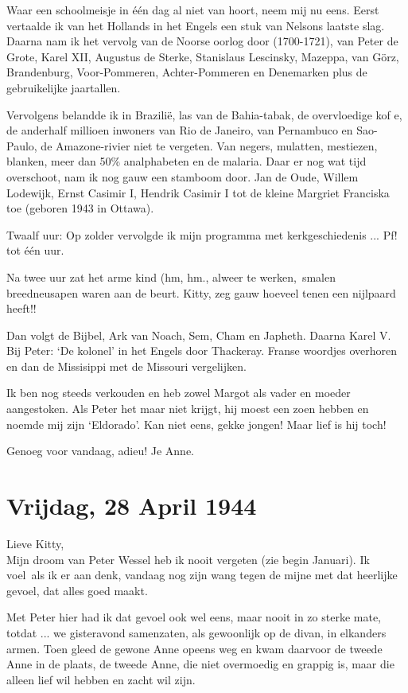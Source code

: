 \documentclass{book}
\begin{document}
Waar een schoolmeisje in één dag al niet van hoort, neem mij nu eens.
Eerst vertaalde ik van het Hollands in het Engels een stuk van Nelsons
laatste slag. Daarna nam ik het vervolg van de Noorse oorlog door
(1700-1721), van Peter de Grote, Karel XII, Augustus de Sterke,
Stanislaus Lescinsky, Mazeppa, van Görz, Brandenburg, Voor-Pommeren,
Achter-Pommeren en Denemarken plus de gebruikelijke jaartallen.

Vervolgens belandde ik in Brazilië, las van de Bahia-tabak, de
overvloedige kof e, de anderhalf millioen inwoners van Rio de Janeiro,
van Pernambuco en Sao-Paulo, de Amazone-rivier niet te vergeten. Van
negers, mulatten, mestiezen, blanken, meer dan 50\% analphabeten en de
malaria. Daar er nog wat tijd overschoot, nam ik nog gauw een stamboom
door. Jan de Oude, Willem Lodewijk, Ernst Casimir I, Hendrik Casimir I
tot de kleine Margriet Franciska toe (geboren 1943 in Ottawa).

Twaalf uur: Op zolder vervolgde ik mijn programma met kerkgeschiedenis
... Pf! tot één uur.

Na twee uur zat het arme kind (hm, hm., alweer te werken,~smalen
breedneusapen waren aan de beurt. Kitty, zeg gauw hoeveel tenen een
nijlpaard heeft!!

Dan volgt de Bijbel, Ark van Noach, Sem, Cham en Japheth. Daarna Karel
V. Bij Peter: `De kolonel' in het Engels door Thackeray. Franse woordjes
overhoren en dan de Missisippi met de Missouri vergelijken.

Ik ben nog steeds verkouden en heb zowel Margot als vader en moeder
aangestoken. Als Peter het maar niet krijgt, hij moest een zoen hebben
en noemde mij zijn `Eldorado'. Kan niet eens, gekke jongen! Maar lief is
hij toch!

Genoeg voor vandaag, adieu! Je Anne.

\chapter{Vrijdag, 28 April 1944}

Lieve Kitty,\\Mijn droom van Peter Wessel heb ik nooit vergeten (zie
begin Januari). Ik voel~als ik er aan denk, vandaag nog zijn wang tegen
de mijne met dat heerlijke gevoel, dat alles goed maakt.

Met Peter hier had ik dat gevoel ook wel eens, maar nooit in zo sterke
mate, totdat ... we gisteravond samenzaten, als gewoonlijk op de divan,
in elkanders armen. Toen gleed de gewone Anne opeens weg en kwam
daarvoor de tweede Anne in de plaats, de tweede Anne, die niet
overmoedig en grappig is, maar die alleen lief wil hebben en zacht wil
zijn.
\end{document}
